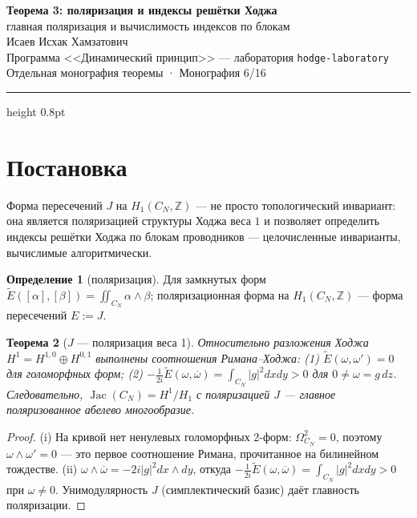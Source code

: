 \documentclass[11pt,a4paper]{article}
\theoremstyle{plain}
\newtheorem{theorem}{Теорема}
\theoremstyle{definition}
\newtheorem{definition}[theorem]{Определение}
\theoremstyle{remark}
\newcommand{\ZZ}{\mathbb{Z}}
\newcommand{\Jac}{\operatorname{Jac}}
\begin{document}
\begin{center}
{\LARGE\bfseries Теорема 3: поляризация и индексы решётки Ходжа}\\[0.4em]
{\large главная поляризация и вычислимость индексов по блокам}\\[0.6em]
{\normalsize Исаев Исхак Хамзатович}\\[0.2em]
{\small Программа <<Динамический принцип>> --- лаборатория \texttt{hodge-laboratory}}\\[0.15em]
{\small Отдельная монография теоремы · Монография 6/16}
\end{center}
\vspace{0.4em}
{\color{linkblue}\hrule height 0.8pt}
\vspace{0.8em}

\section{Постановка}

Форма пересечений $J$ на $H_1(C_N,\ZZ)$ --- не просто топологический
инвариант: она является поляризацией структуры Ходжа веса $1$ и
позволяет определить индексы решётки Ходжа по блокам проводников ---
целочисленные инварианты, вычислимые алгоритмически.

\begin{definition}[поляризация]
Для замкнутых форм $\widetilde E([\alpha],[\beta])
=\iint_{C_N}\alpha\wedge\beta$; поляризационная форма на
$H_1(C_N,\ZZ)$ --- форма пересечений $E:=J$.
\end{definition}

\begin{theorem}[$J$ --- поляризация веса 1]\label{th:pol}
Относительно разложения Ходжа
$H^1=H^{1,0}\oplus H^{0,1}$ выполнены соотношения Римана--Ходжа:
(1) $\widetilde E(\omega,\omega')=0$ для голоморфных форм;
(2) $-\frac1{2i}\widetilde E(\omega,\overline{\omega})
=\int_{C_N}|g|^2dxdy>0$ для $0\ne\omega=g\,dz$.
Следовательно, $\Jac(C_N)=H^1/H_1$ с поляризацией $J$ ---
главное поляризованное абелево многообразие.
\end{theorem}

\begin{proof}
(i) На кривой нет ненулевых голоморфных 2-форм:
$\Omega^2_{C_N}=0$, поэтому $\omega\wedge\omega'=0$ --- это первое
соотношение Римана, прочитанное на билинейном тождестве.
(ii) $\omega\wedge\overline{\omega}=-2i|g|^2dx\wedge dy$, откуда
$-\frac1{2i}\widetilde E(\omega,\overline{\omega})
=\int_{C_N}|g|^2dxdy>0$ при $\omega\ne0$.
Унимодулярность $J$ (симплектический базис) даёт главность
поляризации.
\end{proof}
\end{document}

